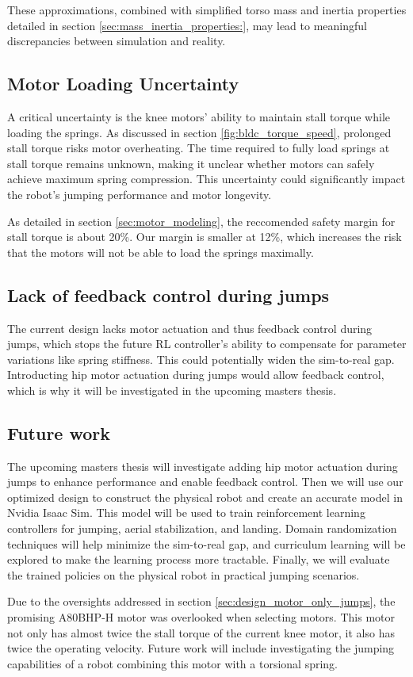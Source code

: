 These approximations, combined with simplified torso mass and inertia properties detailed in section \ref{sec:mass_inertia_properties:}, may lead to meaningful discrepancies between simulation and reality.

\subsection{Motor Loading Uncertainty}
A critical uncertainty is the knee motors' ability to maintain stall torque while loading the springs. As discussed in section \ref{fig:bldc_torque_speed}, prolonged stall torque risks motor overheating. The time required to fully load springs at stall torque remains unknown, making it unclear whether motors can safely achieve maximum spring compression. This uncertainty could significantly impact the robot's jumping performance and motor longevity.

As detailed in section \ref{sec:motor_modeling}, the reccomended safety margin for stall torque is about 20\%. Our margin is smaller at 12\%, which increases the risk that the motors will not be able to load the springs maximally.

\subsection{Lack of feedback control during jumps}
The current design lacks motor actuation and thus feedback control during jumps, which stops the future RL controller's ability to compensate for parameter variations like spring stiffness. This could potentially widen the sim-to-real gap. Introducting hip motor actuation during jumps would allow feedback control, which is why it will be investigated in the upcoming masters thesis.


\subsection{Future work}
\label{sec:future_work}
The upcoming masters thesis will investigate adding hip motor actuation during jumps to enhance performance and enable feedback control. Then we will use our optimized design to construct the physical robot and create an accurate model in Nvidia Isaac Sim. This model will be used to train reinforcement learning controllers for jumping, aerial stabilization, and landing. Domain randomization techniques will help minimize the sim-to-real gap, and curriculum learning will be explored to make the learning process more tractable. Finally, we will evaluate the trained policies on the physical robot in practical jumping scenarios.

Due to the oversights addressed in section \ref{sec:design_motor_only_jumps}, the promising A80BHP-H motor was overlooked when selecting motors. This motor not only has almost twice the stall torque of the current knee motor, it also has twice the operating velocity. Future work will include investigating the jumping capabilities of a robot combining this motor with a torsional spring.
